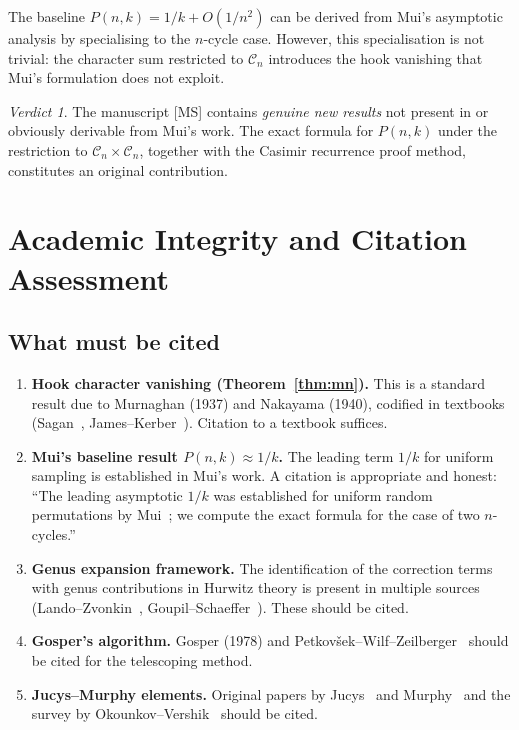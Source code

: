 \documentclass[12pt, a4paper]{amsart}
\theoremstyle{plain}
\theoremstyle{definition}
\theoremstyle{remark}
\newtheorem*{verdict}{Verdict}
\newcommand{\C}{\mathcal{C}}
\begin{document}
The baseline $P(n,k)=1/k+O(1/n^2)$ can be derived from Mui's asymptotic analysis
by specialising to the $n$-cycle case.  However, this specialisation is not
trivial: the character sum restricted to $\C_n$ introduces the hook vanishing
that Mui's formulation does not exploit.

\begin{verdict}
The manuscript [MS] contains \emph{genuine new results} not present in or
obviously derivable from Mui's work.  The exact formula for $P(n,k)$ under the
restriction to $\C_n\times\C_n$, together with the Casimir recurrence proof
method, constitutes an original contribution.
\end{verdict}

\section{Academic Integrity and Citation Assessment}
\label{sec:integrity}

\subsection{What must be cited}

\begin{enumerate}[label=(\alph*)]
  \item \textbf{Hook character vanishing (Theorem~\ref{thm:mn}).}
        This is a standard result due to Murnaghan (1937) and Nakayama (1940),
        codified in textbooks (Sagan~\cite{sagan}, James--Kerber~\cite{james}).
        Citation to a textbook suffices.

  \item \textbf{Mui's baseline result $P(n,k)\approx 1/k$.}
        The leading term $1/k$ for uniform sampling is established in Mui's work.
        A citation is appropriate and honest: ``The leading asymptotic $1/k$
        was established for uniform random permutations by Mui~\cite{mui2}; we
        compute the exact formula for the case of two $n$-cycles.''

  \item \textbf{Genus expansion framework.}
        The identification of the correction terms with genus contributions in
        Hurwitz theory is present in multiple sources (Lando--Zvonkin~\cite{lz},
        Goupil--Schaeffer~\cite{gs}).  These should be cited.

  \item \textbf{Gosper's algorithm.}
        Gosper (1978) \cite{gosper} and Petkov\v{s}ek--Wilf--Zeilberger~\cite{pwz}
        should be cited for the telescoping method.

  \item \textbf{Jucys--Murphy elements.}
        Original papers by Jucys~\cite{jucys} and Murphy~\cite{murphy} and the
        survey by Okounkov--Vershik~\cite{ov} should be cited.
\end{enumerate}
\end{document}
